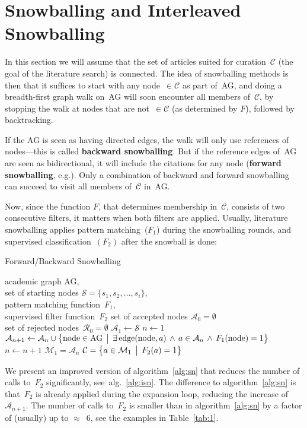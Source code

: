 \documentclass{article}
\begin{document}
\section*{Snowballing and Interleaved Snowballing}
In this section we will assume that the set of articles suited for curation~$\mathcal{C}$ (the goal of the literature search) is connected. The idea of snowballing methods is then that it suffices to start with any node~$\in\mathcal{C}$ as part of~AG, and doing a breadth-first graph walk on~AG will soon encounter all members of~$\mathcal{C}$, by stopping the walk at nodes that are not~$\in\mathcal{C}$ (as determined by $F$), followed by backtracking\cite{choong2014automatic}.

If the AG is seen as having directed edges, the walk will only use references of nodes---this is called \textbf{backward snowballing}. But if the reference edges of~AG are seen as bidirectional, it will include the citations for any node (\textbf{forward snowballing}, e.g.\cite{felizardo2016using}). Only a combination of backward and forward snowballing can succeed to visit all members of~$\mathcal{C}$ in~AG.

Now, since the function $F$, that determines membership in~$\mathcal{C}$, consists of two consecutive filters, it matters when both filters are applied. Usually, literature snowballing applies pattern matching~($F_1$) during the snowballing rounds, and supervised classification~$(F_2)$ after the snowball is done:

\begin{algorithm}
\caption{Forward/Backward Snowballing}\label{alg:sn}
\begin{algorithmic}
\Require academic graph AG,\\ set of starting nodes $\mathcal{S}=\{s_1, s_2,\dots, s_i\}$,\\ pattern matching function~$F_1$,\\ supervised filter function~$F_2$
\State set of accepted nodes $\mathcal{A}_0 = \emptyset$\\ set of rejected nodes~$\mathcal{R}_0=\emptyset$
\State $\mathcal{A}_1 \gets \mathcal{S}$
\State $n \gets 1$
\State $\mathcal{A}_{n+1} \gets \mathcal{A}_n \cup \bigl\{\text{node} \in \text{AG}\,\bigm|\,\exists \,\text{edge}(\text{node},a) \,\wedge\, a\in\mathcal{A}_n \,\wedge\, F_1(\text{node})=1 \bigr\} $
\State $n \gets n+1$
\EndWhile
\State $\mathcal{M}_1 = \mathcal{A}_n$
\State $\mathcal{C} = \bigl\{a\in\mathcal{M}_1 \,\bigm|\, F_2(a) = 1 \bigr\}$
\end{algorithmic}
\end{algorithm}
We present an improved version of algorithm~\ref{alg:sn} that reduces the number of calls to~$F_2$ significantly, see~alg.~\ref{alg:isn}. The difference to algorithm~\ref{alg:sn} is that~$F_2$ is already applied during the expansion loop, reducing the increase of~$\mathcal{A}_{n+1}$. The number of calls to~$F_2$ is smaller than in algorithm~\ref{alg:sn} by a factor of (usually) up to $\approx$~6, see the examples in Table~\ref{tab:1}.
\end{document}
